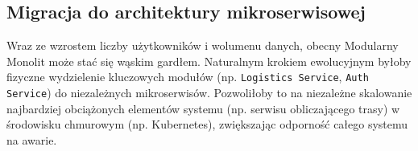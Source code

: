 \subsection{Migracja do architektury mikroserwisowej}
Wraz ze wzrostem liczby użytkowników i wolumenu danych, obecny Modularny Monolit może stać się wąskim gardłem. Naturalnym krokiem ewolucyjnym byłoby fizyczne wydzielenie kluczowych modułów (np. \texttt{Logistics Service}, \texttt{Auth Service}) do niezależnych mikroserwisów. Pozwoliłoby to na niezależne skalowanie najbardziej obciążonych elementów systemu (np. serwisu obliczającego trasy) w środowisku chmurowym (np. Kubernetes), zwiększając odporność całego systemu na awarie.